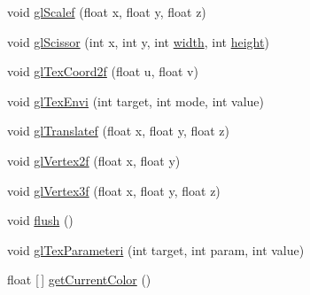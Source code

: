 \begin{DoxyCompactItemize}
\item 
void \mbox{\hyperlink{classorg_1_1newdawn_1_1slick_1_1opengl_1_1renderer_1_1_immediate_mode_o_g_l_renderer_ae2a00de1d4a29e658ca63685b1870413}{gl\+Scalef}} (float x, float y, float z)
\item 
void \mbox{\hyperlink{classorg_1_1newdawn_1_1slick_1_1opengl_1_1renderer_1_1_immediate_mode_o_g_l_renderer_ad15ad5c6d86bfdabcb2b973506dd0cb3}{gl\+Scissor}} (int x, int y, int \mbox{\hyperlink{classorg_1_1newdawn_1_1slick_1_1opengl_1_1renderer_1_1_immediate_mode_o_g_l_renderer_a65d0a04d747368ea954f69074d9102d6}{width}}, int \mbox{\hyperlink{classorg_1_1newdawn_1_1slick_1_1opengl_1_1renderer_1_1_immediate_mode_o_g_l_renderer_aec68994a0ee3b7b478122af823c8a8d7}{height}})
\item 
void \mbox{\hyperlink{classorg_1_1newdawn_1_1slick_1_1opengl_1_1renderer_1_1_immediate_mode_o_g_l_renderer_a12f389fdfcea07900618c8c5a219092a}{gl\+Tex\+Coord2f}} (float u, float v)
\item 
void \mbox{\hyperlink{classorg_1_1newdawn_1_1slick_1_1opengl_1_1renderer_1_1_immediate_mode_o_g_l_renderer_ac494c89daacc662a13738f125120b202}{gl\+Tex\+Envi}} (int target, int mode, int value)
\item 
void \mbox{\hyperlink{classorg_1_1newdawn_1_1slick_1_1opengl_1_1renderer_1_1_immediate_mode_o_g_l_renderer_af435628534b92fba8004ef8b4b6b388a}{gl\+Translatef}} (float x, float y, float z)
\item 
void \mbox{\hyperlink{classorg_1_1newdawn_1_1slick_1_1opengl_1_1renderer_1_1_immediate_mode_o_g_l_renderer_a0ebc0c399fb4cd6010f9a13f2ebc927f}{gl\+Vertex2f}} (float x, float y)
\item 
void \mbox{\hyperlink{classorg_1_1newdawn_1_1slick_1_1opengl_1_1renderer_1_1_immediate_mode_o_g_l_renderer_ab4aa458f50e3ba4f3abeb2818291ea4d}{gl\+Vertex3f}} (float x, float y, float z)
\item 
void \mbox{\hyperlink{classorg_1_1newdawn_1_1slick_1_1opengl_1_1renderer_1_1_immediate_mode_o_g_l_renderer_afe7b9f862d9e3c25ade32c1de777577b}{flush}} ()
\item 
void \mbox{\hyperlink{classorg_1_1newdawn_1_1slick_1_1opengl_1_1renderer_1_1_immediate_mode_o_g_l_renderer_a67bbcf08210460ee57b47e9d3e746248}{gl\+Tex\+Parameteri}} (int target, int param, int value)
\item 
float \mbox{[}$\,$\mbox{]} \mbox{\hyperlink{classorg_1_1newdawn_1_1slick_1_1opengl_1_1renderer_1_1_immediate_mode_o_g_l_renderer_ad17f021212377ce528f3aa5fb6326e40}{get\+Current\+Color}} ()
\item 

\end{DoxyCompactItemize}
